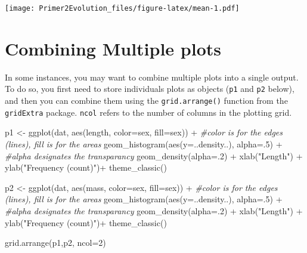 \documentclass[
]{book}
\newenvironment{Shaded}{\begin{snugshade}}{\end{snugshade}}
\newcommand{\AttributeTok}[1]{\textcolor[rgb]{0.77,0.63,0.00}{#1}}
\newcommand{\CommentTok}[1]{\textcolor[rgb]{0.56,0.35,0.01}{\textit{#1}}}
\newcommand{\DecValTok}[1]{\textcolor[rgb]{0.00,0.00,0.81}{#1}}
\newcommand{\FunctionTok}[1]{\textcolor[rgb]{0.00,0.00,0.00}{#1}}
\newcommand{\NormalTok}[1]{#1}
\newcommand{\OtherTok}[1]{\textcolor[rgb]{0.56,0.35,0.01}{#1}}
\newcommand{\SpecialCharTok}[1]{\textcolor[rgb]{0.00,0.00,0.00}{#1}}
\newcommand{\StringTok}[1]{\textcolor[rgb]{0.31,0.60,0.02}{#1}}
\begin{document}
\texttt{[image: Primer2Evolution\_files/figure-latex/mean-1.pdf]}

\hypertarget{combining-multiple-plots}{%
\section{Combining Multiple plots}\label{combining-multiple-plots}}

In some instances, you may want to combine multiple plots into a single output. To do so, you first need to store individuals plots as objects (\texttt{p1} and \texttt{p2} below), and then you can combine them using the \texttt{grid.arrange()} function from the \texttt{gridExtra} package. \texttt{ncol} refers to the number of columns in the plotting grid.

\begin{Shaded}
\begin{Highlighting}[]
\NormalTok{p1 }\OtherTok{\textless{}{-}} \FunctionTok{ggplot}\NormalTok{(dat, }\FunctionTok{aes}\NormalTok{(length, }\AttributeTok{color=}\NormalTok{sex, }\AttributeTok{fill=}\NormalTok{sex)) }\SpecialCharTok{+} \CommentTok{\#color is for the edges (lines), fill is for the areas}
    \FunctionTok{geom\_histogram}\NormalTok{(}\FunctionTok{aes}\NormalTok{(}\AttributeTok{y=}\NormalTok{..density..), }\AttributeTok{alpha=}\NormalTok{.}\DecValTok{5}\NormalTok{) }\SpecialCharTok{+} \CommentTok{\#alpha designates the transparancy}
    \FunctionTok{geom\_density}\NormalTok{(}\AttributeTok{alpha=}\NormalTok{.}\DecValTok{2}\NormalTok{) }\SpecialCharTok{+} 
    \FunctionTok{xlab}\NormalTok{(}\StringTok{"Length"}\NormalTok{) }\SpecialCharTok{+}
    \FunctionTok{ylab}\NormalTok{(}\StringTok{"Frequency (count)"}\NormalTok{)}\SpecialCharTok{+}
    \FunctionTok{theme\_classic}\NormalTok{()}

\NormalTok{p2 }\OtherTok{\textless{}{-}} \FunctionTok{ggplot}\NormalTok{(dat, }\FunctionTok{aes}\NormalTok{(mass, }\AttributeTok{color=}\NormalTok{sex, }\AttributeTok{fill=}\NormalTok{sex)) }\SpecialCharTok{+} \CommentTok{\#color is for the edges (lines), fill is for the areas}
    \FunctionTok{geom\_histogram}\NormalTok{(}\FunctionTok{aes}\NormalTok{(}\AttributeTok{y=}\NormalTok{..density..), }\AttributeTok{alpha=}\NormalTok{.}\DecValTok{5}\NormalTok{) }\SpecialCharTok{+} \CommentTok{\#alpha designates the transparancy}
    \FunctionTok{geom\_density}\NormalTok{(}\AttributeTok{alpha=}\NormalTok{.}\DecValTok{2}\NormalTok{) }\SpecialCharTok{+} 
    \FunctionTok{xlab}\NormalTok{(}\StringTok{"Length"}\NormalTok{) }\SpecialCharTok{+}
    \FunctionTok{ylab}\NormalTok{(}\StringTok{"Frequency (count)"}\NormalTok{)}\SpecialCharTok{+}
    \FunctionTok{theme\_classic}\NormalTok{()}

\FunctionTok{grid.arrange}\NormalTok{(p1,p2, }\AttributeTok{ncol=}\DecValTok{2}\NormalTok{)}
\end{Highlighting}
\end{Shaded}
\end{document}
